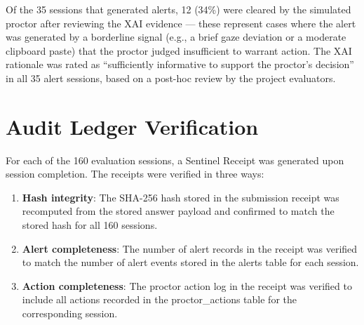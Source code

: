 \begin{table}[htbp]
    \centering
    \caption{Post-examination proctoring verdict distribution across all 160 evaluation sessions.}
    \label{tab:verdicts}
\end{table}

Of the 35 sessions that generated alerts, 12 (34\%) were cleared by the simulated proctor after reviewing the XAI evidence --- these represent cases where the alert was generated by a borderline signal (e.g., a brief gaze deviation or a moderate clipboard paste) that the proctor judged insufficient to warrant action. The XAI rationale was rated as ``sufficiently informative to support the proctor's decision'' in all 35 alert sessions, based on a post-hoc review by the project evaluators.

\section{Audit Ledger Verification}

For each of the 160 evaluation sessions, a Sentinel Receipt was generated upon session completion. The receipts were verified in three ways:

\begin{enumerate}
    \item \textbf{Hash integrity}: The SHA-256 hash stored in the submission receipt was recomputed from the stored answer payload and confirmed to match the stored hash for all 160 sessions.
    \item \textbf{Alert completeness}: The number of alert records in the receipt was verified to match the number of alert events stored in the alerts table for each session.
    \item \textbf{Action completeness}: The proctor action log in the receipt was verified to include all actions recorded in the proctor\_actions table for the corresponding session.
\end{enumerate}

